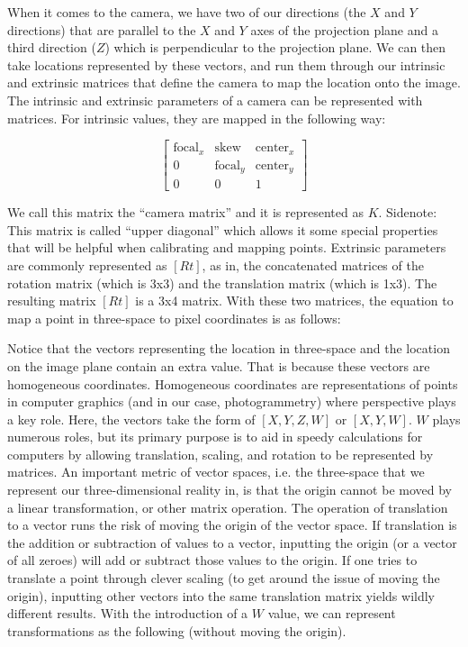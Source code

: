\documentclass[12pt,twoside]{reedthesis}
\begin{document}
When it comes to the camera, we have two of our directions (the $X$ and $Y$ directions) that are parallel to the $X$ and $Y$ axes of the projection plane and a third direction ($Z$) which is perpendicular to the projection plane. We can then take locations represented by these vectors, and run them through our intrinsic and extrinsic matrices that define the camera to map the location onto the image. The intrinsic and extrinsic parameters of a camera can be represented with matrices. For intrinsic values, they are mapped in the following way:

\[\begin{bmatrix}
\text{focal}_x & \text{skew} & \text{center}_x \\
0 & \text{focal}_y & \text{center}_y \\
0 & 0 & 1
\end{bmatrix}\]

We call this matrix the “camera matrix” and it is represented as $K$. Sidenote: This matrix is called “upper diagonal” which allows it some special properties that will be helpful when calibrating and mapping points.
Extrinsic parameters are commonly represented as $[R t]$, as in, the concatenated matrices of the rotation matrix (which is 3x3) and the translation matrix (which is 1x3). The resulting matrix $[R t]$ is a 3x4 matrix. With these two matrices, the equation to map a point in three-space to pixel coordinates is as follows:

Notice that the vectors representing the location in three-space and the location on the image plane contain an extra value. That is because these vectors are homogeneous coordinates. Homogeneous coordinates are representations of points in computer graphics (and in our case, photogrammetry) where perspective plays a key role. Here, the vectors take the form of $[X,Y,Z,W]$ or $[X,Y,W]$. $W$ plays numerous roles, but its primary purpose is to aid in speedy calculations for computers by allowing translation, scaling, and rotation to be represented by matrices. An important metric of vector spaces, i.e. the three-space that we represent our three-dimensional reality in, is that the origin cannot be moved by a linear transformation, or other matrix operation. The operation of translation to a vector runs the risk of moving the origin of the vector space. If translation is the addition or subtraction of values to a vector, inputting the origin (or a vector of all zeroes) will add or subtract those values to the origin. If one tries to translate a point through clever scaling (to get around the issue of moving the origin), inputting other vectors into the same translation matrix yields wildly different results. With the introduction of a $W$ value, we can represent transformations as the following (without moving the origin).
\end{document}
